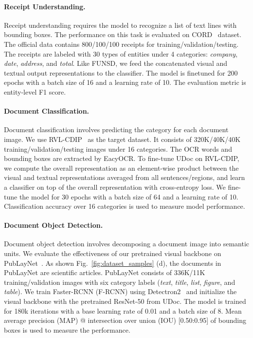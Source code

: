 \documentclass{article}
\begin{document}
	\paragraph{Receipt Understanding.}
	Receipt understanding requires the model {to} recognize a list of text lines with bounding boxes.
	{The performance on this task is evaluated} on CORD~\cite{park2019cord} dataset. The official data contains 800/100/100 receipts for training/validation/testing. {The receipts are} labeled with 30 types of entities under 4 categories: \textit{company}, \textit{date}, \textit{address}, and \textit{total}. Like FUNSD, we feed the concatenated visual and textual output representation{s} to the classifier. The model is finetuned for 200 epochs with a batch size of 16 and a learning rate of 10. The evaluation metric is entity-level F1 score.
	
	\paragraph{Document Classification.}
	Document classification {involves predicting} the category for each document image.
	We use RVL-CDIP~\cite{harley2015icdar} as the target dataset. It consists of 320K/40K/40K training/validation/testing images {under} {16 categories}. The OCR words and bounding boxes are extracted by EacyOCR. To fine-tune UDoc on RVL-CDIP, we compute the overall representation as an element-wise product between {the} visual and textual representations {averaged from all sentences/regions}, and learn a classifier {on top of the overall representation} with cross-entropy loss. 
	We fine-tune the model for 30 epochs with a batch size of 64 and a learning rate of 10. Classification accuracy over 16 {categories} is used to measure model performance.
	
	\paragraph{Document {Object} Detection.}
	Document object detection {involves decomposing} a document image into semantic units. We evaluate the effectiveness of {our} pretrained visual backbone on PubLayNet~\cite{zhong2019publaynet}. As shown Fig.~\ref{fig:dataset_samples} (d), the documents in PubLayNet are scientific articles. PubLayNet consists of 336K/11K training/validation images with six category {labels} (\textit{text}, \textit{title}, \textit{list}, \textit{figure}, and \textit{table}).
	We train Faster-RCNN (F-RCNN) using Detectron2~\cite{wu2019detectron2} and initialize the visual backbone with the pretrained ResNet-50 from UDoc.
	The model is trained for 180k iterations with a base learning rate of 0.01 and a batch size of 8. Mean average precision (MAP) @ intersection over union (IOU) [0.50:0.95] of bounding boxes is used to measure the performance.
	
\end{document}
